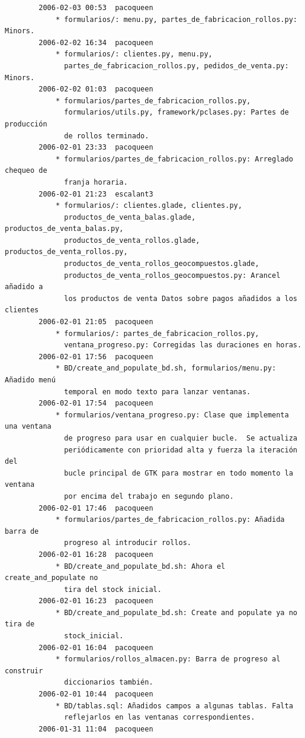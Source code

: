 \documentclass[a4paper]{article}
\begin{document}
\begin{verbatim}
        2006-02-03 00:53  pacoqueen
            * formularios/: menu.py, partes_de_fabricacion_rollos.py: Minors.
        2006-02-02 16:34  pacoqueen
            * formularios/: clientes.py, menu.py,
              partes_de_fabricacion_rollos.py, pedidos_de_venta.py: Minors.
        2006-02-02 01:03  pacoqueen
            * formularios/partes_de_fabricacion_rollos.py,
              formularios/utils.py, framework/pclases.py: Partes de producción
              de rollos terminado.
        2006-02-01 23:33  pacoqueen
            * formularios/partes_de_fabricacion_rollos.py: Arreglado chequeo de
              franja horaria.
        2006-02-01 21:23  escalant3
            * formularios/: clientes.glade, clientes.py,
              productos_de_venta_balas.glade, productos_de_venta_balas.py,
              productos_de_venta_rollos.glade, productos_de_venta_rollos.py,
              productos_de_venta_rollos_geocompuestos.glade,
              productos_de_venta_rollos_geocompuestos.py: Arancel añadido a
              los productos de venta Datos sobre pagos añadidos a los clientes
        2006-02-01 21:05  pacoqueen
            * formularios/: partes_de_fabricacion_rollos.py,
              ventana_progreso.py: Corregidas las duraciones en horas.
        2006-02-01 17:56  pacoqueen
            * BD/create_and_populate_bd.sh, formularios/menu.py: Añadido menú
              temporal en modo texto para lanzar ventanas.
        2006-02-01 17:54  pacoqueen
            * formularios/ventana_progreso.py: Clase que implementa una ventana
              de progreso para usar en cualquier bucle.  Se actualiza
              periódicamente con prioridad alta y fuerza la iteración del
              bucle principal de GTK para mostrar en todo momento la ventana
              por encima del trabajo en segundo plano.
        2006-02-01 17:46  pacoqueen
            * formularios/partes_de_fabricacion_rollos.py: Añadida barra de
              progreso al introducir rollos.
        2006-02-01 16:28  pacoqueen
            * BD/create_and_populate_bd.sh: Ahora el create_and_populate no
              tira del stock inicial.
        2006-02-01 16:23  pacoqueen
            * BD/create_and_populate_bd.sh: Create and populate ya no tira de
              stock_inicial.
        2006-02-01 16:04  pacoqueen
            * formularios/rollos_almacen.py: Barra de progreso al construir
              diccionarios también.
        2006-02-01 10:44  pacoqueen
            * BD/tablas.sql: Añadidos campos a algunas tablas. Falta
              reflejarlos en las ventanas correspondientes.
        2006-01-31 11:04  pacoqueen

\end{verbatim}
\end{document}
